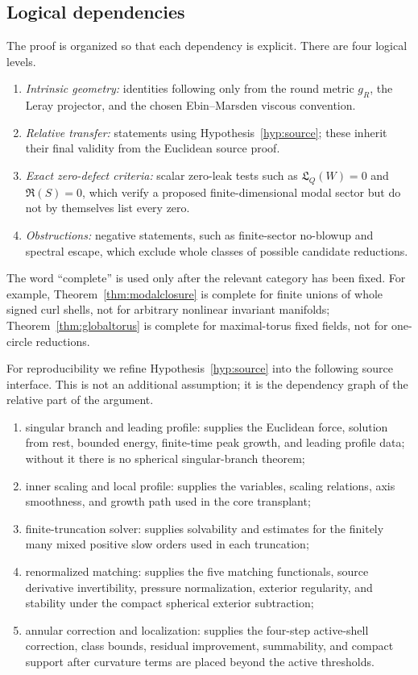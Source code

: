 \documentclass[aps,prd,reprint,superscriptaddress,nofootinbib,floatfix]{revtex4-2}
\theoremstyle{definition}
\theoremstyle{remark}
\begin{document}
\subsection{Logical dependencies}\label{subsec:dependencies}

The proof is organized so that each dependency is explicit.  There are four logical levels.

\begin{enumerate}[label=(\Alph*),leftmargin=*]
	\item \emph{Intrinsic geometry:} identities following only from the round metric \(g_R\), the Leray projector, and the chosen Ebin--Marsden viscous convention.
	\item \emph{Relative transfer:} statements using Hypothesis~\ref{hyp:source}; these inherit their final validity from the Euclidean source proof.
	\item \emph{Exact zero-defect criteria:} scalar zero-leak tests such as \(\mathfrak L_Q(W)=0\) and \(\mathfrak R(S)=0\), which verify a proposed finite-dimensional modal sector but do not by themselves list every zero.
	\item \emph{Obstructions:} negative statements, such as finite-sector no-blowup and spectral escape, which exclude whole classes of possible candidate reductions.
\end{enumerate}

The word ``complete'' is used only after the relevant category has been fixed.  For example, Theorem~\ref{thm:modalclosure} is complete for finite unions of whole signed curl shells, not for arbitrary nonlinear invariant manifolds; Theorem~\ref{thm:globaltorus} is complete for maximal-torus fixed fields, not for one-circle reductions.

For reproducibility we refine Hypothesis~\ref{hyp:source} into the following source interface.  This is not an additional assumption; it is the dependency graph of the relative part of the argument.

\begin{enumerate}[label=\(S_{\arabic*}\),leftmargin=*,start=0]
	\item singular branch and leading profile: supplies the Euclidean force, solution from rest, bounded energy, finite-time peak growth, and leading profile data; without it there is no spherical singular-branch theorem;
	\item inner scaling and local profile: supplies the variables, scaling relations, axis smoothness, and growth path used in the core transplant;
	\item finite-truncation solver: supplies solvability and estimates for the finitely many mixed positive slow orders used in each truncation;
	\item renormalized matching: supplies the five matching functionals, source derivative invertibility, pressure normalization, exterior regularity, and stability under the compact spherical exterior subtraction;
	\item annular correction and localization: supplies the four-step active-shell correction, class bounds, residual improvement, summability, and compact support after curvature terms are placed beyond the active thresholds.
\end{enumerate}
\end{document}
